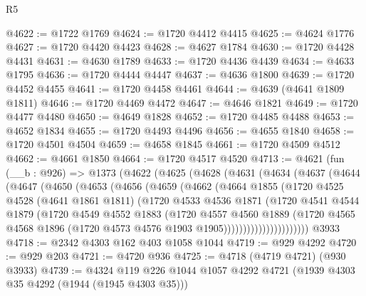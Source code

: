 \begin{lexlean}{R5}
\begin{coremodule}
@4622 := @1722 @1769
@4624 := @1720 @4412 @4415
@4625 := @4624 @1776
@4627 := @1720 @4420 @4423
@4628 := @4627 @1784
@4630 := @1720 @4428 @4431
@4631 := @4630 @1789
@4633 := @1720 @4436 @4439
@4634 := @4633 @1795
@4636 := @1720 @4444 @4447
@4637 := @4636 @1800
@4639 := @1720 @4452 @4455
@4641 := @1720 @4458 @4461
@4644 := @4639 (@4641 @1809 @1811)
@4646 := @1720 @4469 @4472
@4647 := @4646 @1821
@4649 := @1720 @4477 @4480
@4650 := @4649 @1828
@4652 := @1720 @4485 @4488
@4653 := @4652 @1834
@4655 := @1720 @4493 @4496
@4656 := @4655 @1840
@4658 := @1720 @4501 @4504
@4659 := @4658 @1845
@4661 := @1720 @4509 @4512
@4662 := @4661 @1850
@4664 := @1720 @4517 @4520
@4713 := @4621
    (fun (__b : @926) =>
    @1373
      (@4622
        (@4625
          (@4628
            (@4631
              (@4634
                (@4637
                  (@4644
                    (@4647
                      (@4650
                        (@4653
                          (@4656
                            (@4659
                              (@4662
                                (@4664
                                  @1855
                                  (@1720
                                    @4525
                                    @4528
                                    (@4641 @1861 @1811)
                                    (@1720
                                      @4533
                                      @4536
                                      @1871
                                      (@1720
                                        @4541
                                        @4544
                                        @1879
                                        (@1720
                                          @4549
                                          @4552
                                          @1883
                                          (@1720
                                            @4557
                                            @4560
                                            @1889
                                            (@1720
                                              @4565
                                              @4568
                                              @1896
                                              (@1720 @4573 @4576 @1903 @1905))))))))))))))))))))))
    @3933
@4718 := @2342 @4303 @162 @403 @1058 @1044
@4719 := @929 @4292
@4720 := @929 @203
@4721 := @4720 @936
@4725 := @4718 (@4719 @4721) (@930 @3933)
@4739 := @4324 @119 @226 @1044 @1057 @4292 @4721 (@1939 @4303 @35 @4292 (@1944 (@1945 @4303 @35)))

\end{coremodule}
\end{lexlean}
